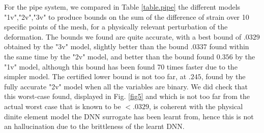 	For the pipe system, we compared in Table \ref{table.pipe} the different models "1v","2v","3v" to produce bounds on the sum of the difference of strain over 10 specific points of the mesh, for a physically relevant perturbation of the deformation. The bounds we found are quite accurate, with a best bound of $.0329$ obtained by the "3v" model, slightly better than the bound $.0337$ found within the same time by the "2v" model, and better than the bound found $0.356$ by the "1v" model, although this bound has been found 70 times faster due to the simpler model. The certified lower bound is not too far, at $.245$, found by the fully accurate "2v" model when all the variables are binary. We did check that this worst-case found, displayed in Fig. \ref{fig5} and which is not too far from the actual worst case that is known to be $<.0329$, is coherent with the physical dinite element model the DNN surrogate has been learnt from, hence this is not an hallucination due to the brittleness of the learnt DNN.


	
	\vspace*{1ex}
	

	
